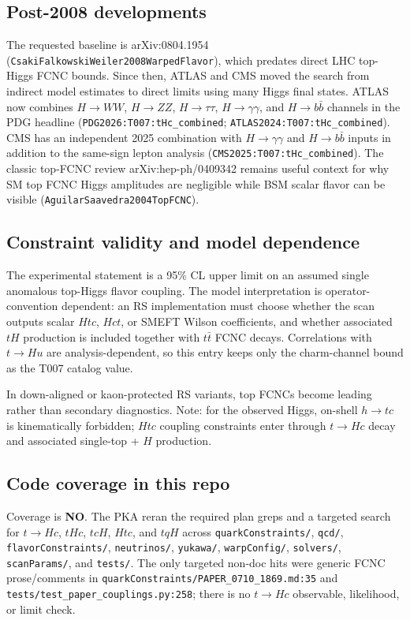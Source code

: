 \subsection*{Post-2008 developments}
The requested baseline is arXiv:0804.1954
(\texttt{CsakiFalkowskiWeiler2008WarpedFlavor}), which predates direct LHC
top-Higgs FCNC bounds.  Since then, ATLAS and CMS moved the search from
indirect model estimates to direct limits using many Higgs final states.  ATLAS
now combines \(H\to WW\), \(H\to ZZ\), \(H\to\tau\tau\),
\(H\to\gamma\gamma\), and \(H\to b\bar b\) channels in the PDG headline
(\texttt{PDG2026:T007:tHc\_combined};
\texttt{ATLAS2024:T007:tHc\_combined}).  CMS has an independent 2025
combination with \(H\to\gamma\gamma\) and \(H\to b\bar b\) inputs in addition
to the same-sign lepton analysis (\texttt{CMS2025:T007:tHc\_combined}).  The
classic top-FCNC review arXiv:hep-ph/0409342 remains useful context for why SM
top FCNC Higgs amplitudes are negligible while BSM scalar flavor can be visible
(\texttt{AguilarSaavedra2004TopFCNC}).

\subsection*{Constraint validity and model dependence}
The experimental statement is a 95\% CL upper limit on an assumed single
anomalous top-Higgs flavor coupling.  The model interpretation is
operator-convention dependent: an RS implementation must choose whether the
scan outputs scalar \(Htc\), \(Hct\), or SMEFT Wilson coefficients, and whether
associated \(tH\) production is included together with \(t\bar t\) FCNC decays.
Correlations with \(t\to Hu\) are analysis-dependent, so this entry keeps only
the charm-channel bound as the T007 catalog value.

In down-aligned or kaon-protected RS variants, top FCNCs become leading rather
than secondary diagnostics.  Note: for the observed Higgs, on-shell \(h\to tc\)
is kinematically forbidden; \(Htc\) coupling constraints enter through
\(t\to Hc\) decay and associated single-top + \(H\) production.

\subsection*{Code coverage in this repo}
Coverage is \textbf{NO}.  The PKA reran the required plan greps and a
targeted search for \(t\to Hc\), \(tHc\), \(tcH\), \(Htc\), and \(tqH\) across
\texttt{quarkConstraints/}, \texttt{qcd/}, \texttt{flavorConstraints/},
\texttt{neutrinos/}, \texttt{yukawa/}, \texttt{warpConfig/},
\texttt{solvers/}, \texttt{scanParams/}, and \texttt{tests/}.  The only
targeted non-doc hits were generic FCNC prose/comments in
\texttt{quarkConstraints/PAPER\_0710\_1869.md:35} and
\texttt{tests/test\_paper\_couplings.py:258}; there is no \(t\to Hc\)
observable, likelihood, or limit check.

